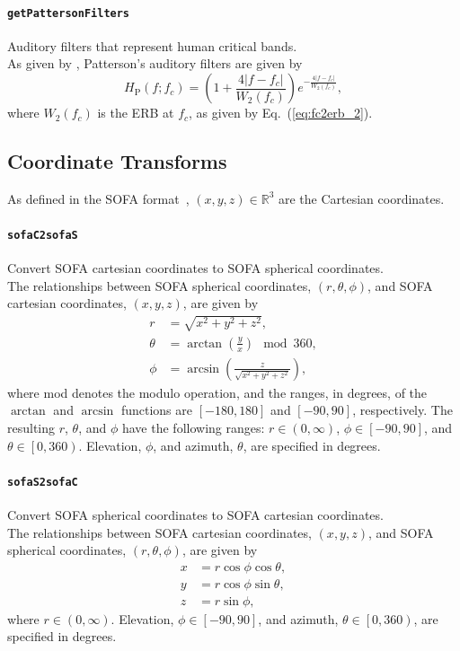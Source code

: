 \documentclass[11pt, oneside]{article}
\newcommand{\eqnref}[1]{Eq.~(\ref{#1})}
\newcommand{\function}[1]{\paragraph*{\texttt{#1}}}
\begin{document}
\function{getPattersonFilters} Auditory filters that represent human critical bands. \\
As given by \citet[Eq.~(5.9)]{Salomons1995PhD}, Patterson's auditory filters are given by
\begin{equation}
H_\text{P}(f;f_c) = \left( 1 + \frac{4|f-f_c|}{W_2(f_c)} \right) e^{-\frac{4|f-f_c|}{W_2(f_c)}},
\end{equation}
where $W_2(f_c)$ is the ERB at $f_c$, as given by \eqnref{eq:fc2erb_2}.



\subsection{Coordinate Transforms}

As defined in the SOFA format~\citep{AES69-2015}, $(x,y,z) \in \mathbb{R}^3$ are the Cartesian coordinates.
\function{sofaC2sofaS} Convert SOFA cartesian coordinates to SOFA spherical coordinates. \\
The relationships between SOFA spherical coordinates, $\left(r,\theta,\phi\right)$, and SOFA cartesian coordinates, $\left(x,y,z\right)$, are given by
\begin{align}
r &= \sqrt{x^2 + y^2 + z^2}, \\
\theta &= \arctan \left(\frac{y}{x}\right) \mod 360, \\
\phi &= \arcsin \left(\frac{z}{\sqrt{x^2 + y^2 + z^2}}\right),
\end{align}
where mod denotes the modulo operation, and the ranges, in degrees, of the $\arctan$ and $\arcsin$ functions are $\left[-180,180\right]$ and $\left[-90,90\right]$, respectively.
The resulting $r$, $\theta$, and $\phi$ have the following ranges: $r \in (0,\infty)$, $\phi \in \left[-90,90\right]$, and $\theta \in \left[0,360\right)$.
Elevation, $\phi$, and azimuth, $\theta$, are specified in degrees.

\function{sofaS2sofaC} Convert SOFA spherical coordinates to SOFA cartesian coordinates. \\
The relationships between SOFA cartesian coordinates, $\left(x,y,z\right)$, and SOFA spherical coordinates, $\left(r,\theta,\phi\right)$, are given by
\begin{align}
x &= r \cos \phi \cos \theta, \\
y &= r \cos \phi \sin \theta, \\
z &= r \sin \phi,
\end{align}
where $r \in (0,\infty)$.
Elevation, $\phi \in \left[-90,90\right]$, and azimuth, $\theta \in \left[0,360\right)$, are specified in degrees.
\end{document}
